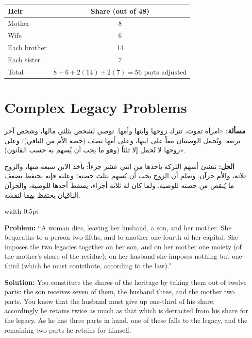 \documentclass[10pt,a4paper]{book}
\newlength{\colwidth}
\newcommand{\bilingualpair}[2]{%
  \noindent
  \begin{minipage}[t]{\colwidth}
  \begin{flushright}
  \vspace{0pt}
  {\arabicfont\small #1}
  \end{flushright}
  \end{minipage}%
  \hfill\textcolor{columnsepclr}{\vrule width 0.5pt}\hfill
  \begin{minipage}[t]{\colwidth}
  \vspace{0pt}
  {\small #2}
  \end{minipage}%
  \par\vspace{0.6em}
}
\begin{document}
\begin{mathbox}
\begin{center}
\begin{tabular}{l|c}
\textbf{Heir} & \textbf{Share (out of 48)} \\
\hline
Mother & 8 \\
Wife & 6 \\
Each brother & 14 \\
Each sister & 7 \\
\hline
Total & $8 + 6 + 2(14) + 2(7) = 56$ parts adjusted \\
\end{tabular}
\end{center}
\end{mathbox}

\section*{Complex Legacy Problems}

\bilingualpair{
\textbf{مسألة:} «امرأة تموت، تترك زوجها وابنها وأمها. توصي
لشخص بثلثي مالها، وشخص آخر بربعه. وتُحمل الوصيتان
معاً على ابنها، وعلى أمها نصف (حصة الأم من الباقي)؛ وعلى
زوجها لا تُحمل إلا ثلثاً (وهو ما يجب أن يُسهم به حسب
القانون)».

\textbf{الحل:} تنشئ أسهم التركة بأخذها من اثني عشر جزءاً:
يأخذ الابن سبعة منها، والزوج ثلاثة، والأم جزآن. وتعلم
أن الزوج يجب أن يُسهم بثلث حصته؛ وعليه فإنه يحتفظ
بضعف ما يُنقص من حصته للوصية. ولما كان له ثلاثة أجزاء،
يسقط أحدها للوصية، والجزآن الباقيان يحتفظ بهما لنفسه.
}{
\textbf{Problem:} ``A woman dies, leaving her husband, a son, and her
mother. She bequeaths to a person two-fifths, and to another one-fourth of
her capital. She imposes the two legacies together on her son, and on her
mother one moiety (of the mother's share of the residue); on her husband she
imposes nothing but one-third (which he must contribute, according to the
law).''

\textbf{Solution:} You constitute the shares of the heritage by taking them
out of twelve parts: the son receives seven of them, the husband three, and
the mother two parts. You know that the husband must give up one-third of
his share; accordingly he retains twice as much as that which is detracted
from his share for the legacy. As he has three parts in hand, one of these
falls to the legacy, and the remaining two parts he retains for himself.
}
\end{document}
